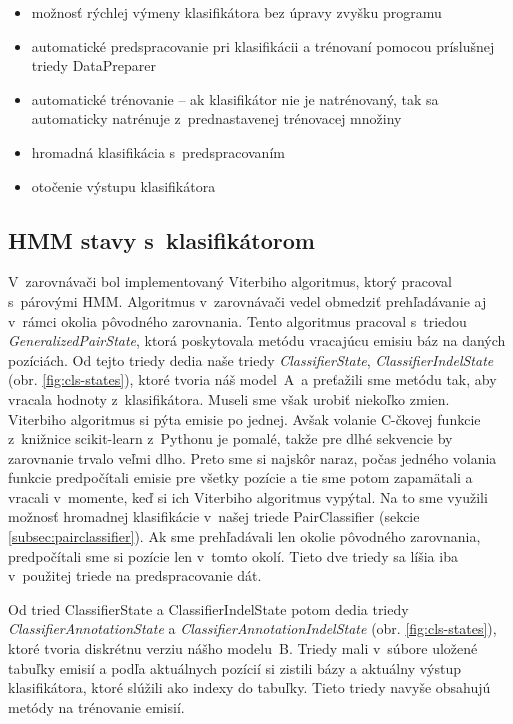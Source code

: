 \begin{itemize}
    \item možnosť rýchlej výmeny klasifikátora bez úpravy zvyšku programu
    \item automatické predspracovanie pri klasifikácii a trénovaní pomocou príslušnej triedy DataPreparer
    \item automatické trénovanie -- ak klasifikátor nie je natrénovaný, tak sa automaticky natrénuje z~prednastavenej trénovacej množiny
    \item hromadná klasifikácia s~predspracovaním
    \item otočenie výstupu klasifikátora
\end{itemize}

\subsection{HMM stavy s~klasifikátorom}
\label{subsec:hmm-states}

V~zarovnávači bol implementovaný Viterbiho algoritmus, ktorý pracoval s~párovými HMM. Algoritmus v~zarovnávači vedel obmedziť prehľadávanie aj v~rámci okolia pôvodného zarovnania. Tento algoritmus pracoval s~triedou \textit{GeneralizedPairState}, ktorá poskytovala metódu  vracajúcu emisiu báz na daných pozíciách. Od tejto triedy dedia naše triedy \textit{ClassifierState}, \textit{ClassifierIndelState} (obr. \ref{fig:cls-states}), ktoré tvoria náš model~A~a preťažili sme metódu  tak, aby vracala hodnoty z~klasifikátora. Museli sme však urobiť niekoľko zmien. Viterbiho algoritmus si pýta emisie po jednej. Avšak volanie C-čkovej funkcie z~knižnice scikit-learn z~Pythonu je pomalé, takže pre dlhé sekvencie by zarovnanie trvalo veľmi dlho. Preto sme si najskôr naraz, počas jedného volania funkcie predpočítali emisie pre všetky pozície a tie sme potom zapamätali a vracali v~momente, keď si ich Viterbiho algoritmus vypýtal. Na to sme využili možnosť hromadnej klasifikácie v~našej triede PairClassifier (sekcie \ref{subsec:pairclassifier}). Ak sme prehľadávali len okolie pôvodného zarovnania, predpočítali sme si pozície len v~tomto okolí. Tieto dve triedy sa líšia iba v~použitej triede na predspracovanie dát.

Od tried ClassifierState a ClassifierIndelState potom dedia triedy \textit{ClassifierAnnotationState} a \textit{ClassifierAnnotationIndelState} (obr. \ref{fig:cls-states}), ktoré tvoria diskrétnu verziu nášho modelu~B. Triedy mali v~súbore uložené tabuľky emisií a podľa aktuálnych pozícií si zistili bázy a aktuálny výstup klasifikátora, ktoré slúžili ako indexy do tabuľky. Tieto triedy navyše obsahujú metódy na trénovanie emisií.

